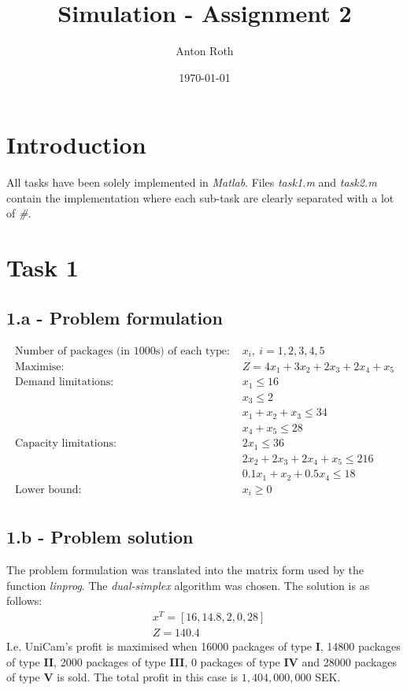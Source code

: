 \documentclass[]{article}
\title{Simulation - Assignment 2}
\author{Anton Roth}
\date{\today}
\begin{document}
\begin{titlepage}
  \maketitle
  \thispagestyle{empty}
\end{titlepage}

\section*{Introduction}
All tasks have been solely implemented in {\it Matlab}. Files \textit{task1.m} and \textit{task2.m} contain the implementation where each sub-task are clearly separated with a lot of \textit{\#}.

\section*{Task 1}

\subsection*{1.a - Problem formulation}
\label{sec:1a}
\begin{align*}
  \text{Number of packages (in 1000s) of each type: } & x_i,\ i = 1, 2, 3, 4, 5 \\
  \text{Maximise: } & Z = 4x_1+3x_2+2x_3+2x_4+x_5 \\
  \text{Demand limitations: } & x_1 \leq 16 \\
  & x_3 \leq 2 \\
  & x_1+x_2+ x_3 \leq 34 \\
  & x_4+ x_5 \leq 28 \\
  \text{Capacity limitations: } & 2x_1 \leq 36 \\
  & 2x_2+2x_3+2x_4+x_5 \leq 216 \\
  & 0.1x_1+x_2+0.5x_4 \leq 18 \\
  \text{Lower bound: } & x_i \geq 0 \\
  \label{al:task1a}
\end{align*}


\subsection*{1.b - Problem solution}
The problem formulation was translated into the matrix form used by the function \textit{linprog}. The \textit{dual-simplex} algorithm was chosen. The solution is as follows:
\begin{align*}
  & x^T = [16, 14.8, 2, 0, 28] \\
  & Z = 140.4
\end{align*}
I.e. UniCam's profit is maximised when 16000 packages of type \textbf{I}, 14800 packages of type \textbf{II}, 2000 packages of type \textbf{III}, 0 packages of type \textbf{IV} and 28000 packages of type \textbf{V} is sold.
The total profit in this case is $1,404,000,000$ SEK.
\end{document}
